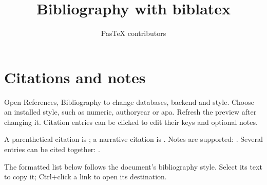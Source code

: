\documentclass{article}
\title{Bibliography with biblatex}
\author{PasTeX contributors}
\date{}
\begin{document}
\maketitle
\section{Citations and notes}
Open References, Bibliography to change databases, backend and style.
Choose an installed style, such as numeric, authoryear or apa. Refresh the
preview after changing it. Citation entries can be clicked to edit their
keys and optional notes.

A parenthetical citation is \parencite{knuth1984}; a narrative citation is
\textcite{lamport1994}. Notes are supported:
\parencite[see][123]{knuth1984}. Several entries can be cited together:
\parencite{knuth1984,lamport1994}.

The formatted list below follows the document's bibliography style.
Select its text to copy it; Ctrl+click a link to open its destination.
\printbibliography
\end{document}
